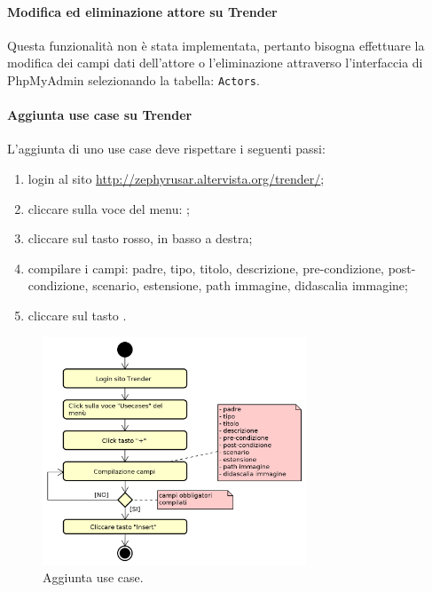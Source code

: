 	    \paragraph{Modifica ed eliminazione attore su Trender}
	    Questa funzionalità non è stata implementata, pertanto bisogna effettuare la modifica dei campi dati dell'attore o l'eliminazione attraverso l'interfaccia di PhpMyAdmin selezionando la tabella: \texttt{Actors}.
	    
	    \paragraph{Aggiunta use case su Trender}
	    L'aggiunta di uno use case deve rispettare i seguenti passi:
	    \begin{enumerate}
	    	\item login al sito \url{http://zephyrusar.altervista.org/trender/};
	    	\item cliccare sulla voce del menu: ;
	    	\item cliccare sul tasto \hicode{+} rosso, in basso a destra;
	    	\item compilare i campi: padre, tipo, titolo, descrizione,  pre-condizione, post-condizione, scenario, estensione, path immagine, didascalia immagine;
	    	\item cliccare sul tasto .
	    \end{enumerate}
	    \begin{figure}[H]
	    	\centering
	    	\includegraphics[width=0.7\textwidth]{img/AggiuntaUC}
	    	\caption{Aggiunta use case.}
	    \end{figure}
    
